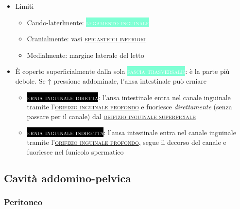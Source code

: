 \documentclass[italian,]{article}
\providecommand{\tightlist}{%
  \setlength{\itemsep}{0pt}\setlength{\parskip}{0pt}}
\newcommand{\tol}[1]{\colorbox{Aquamarine}{\textcolor{white}{\textsc{#1}}}}
\newcommand{\pat}[1]{\colorbox{black}{\textcolor{white}{\textsc{#1}}}}
\renewcommand{\a}[1]{\underline{\textsc{#1}}}
\begin{document}
\begin{itemize}
\tightlist
\item
  Limiti

  \begin{itemize}
  \tightlist
  \item
    Caudo-laterlmente: \tol{legamento inguinale}
  \item
    Cranialmente: vasi \a{epigastrici inferiori}
  \item
    Medialmente: margine laterale del letto
  \end{itemize}
\item
  È coperto superficialmente dalla sola \tol{fascia trasversalis}: è la
  parte più debole. Se ↑ pressione addominale, l'ansa intestinale può
  erniare

  \begin{itemize}
  \tightlist
  \item
    \pat{ernia inguinale diretta}: l'ansa intestinale entra nel canale
    inguinale tramite l'\a{orifizio inguinale profondo} e fuoriesce
    \emph{direttamente} (senza passare per il canale) dal
    \a{orifizio inguinale superficiale}
  \item
    \pat{ernia inguinale indiretta}: l'ansa intestinale entra nel canale
    inguinale tramite l'\a{orifizio inguinale profondo}, segue il
    decorso del canale e fuoriesce nel funicolo spermatico
  \end{itemize}
\end{itemize}

\hypertarget{cavituxe0-addomino-pelvica}{%
\subsection{Cavità addomino-pelvica}\label{cavituxe0-addomino-pelvica}}

\hypertarget{peritoneo}{%
\subsubsection{Peritoneo}\label{peritoneo}}
\end{document}
